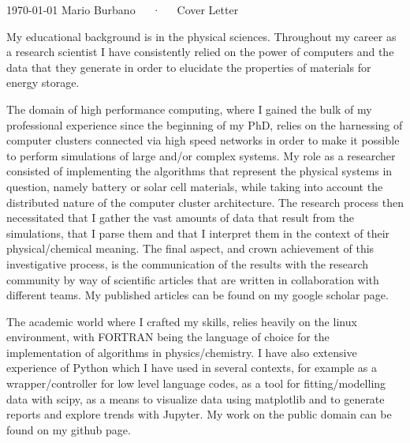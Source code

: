 \documentclass[11pt, a4paper]{awesome-cv}
\begin{document}
\makecvheader[R]

\makecvfooter
  {\today}
  {Mario Burbano~~~·~~~Cover Letter}
  {}

\makelettertitle

\begin{cvletter}


My educational background is in the physical sciences. Throughout my career as a research scientist I have consistently relied on the power of computers and the data that they generate in order to elucidate the properties of materials for energy storage.

The domain of high performance computing, where I gained the bulk of my professional experience since the beginning of my PhD, relies on the harnessing of computer clusters connected via high speed networks in order to make it possible to perform simulations of large and/or complex systems. My role as a researcher consisted of implementing the algorithms that represent the physical systems in question, namely battery or solar cell materials, while taking into account the distributed nature of the computer cluster architecture. The research process then necessitated that I gather the vast amounts of data that result from the simulations, that I parse them and that I interpret them in the context of their physical/chemical meaning. The final aspect, and crown achievement of this investigative process, is the communication of the results with the research community by way of scientific articles that are written in collaboration with different teams. My published articles can be found on my google scholar page.  

The academic world where I crafted my skills, relies heavily on the linux environment, with FORTRAN being the language of choice for the implementation of algorithms in physics/chemistry. I have also extensive experience of Python which I have used in several contexts, for example as a wrapper/controller for low level language codes, as a tool for fitting/modelling data with scipy, as a means to visualize data using matplotlib and to generate reports and explore trends with Jupyter. My work on the public domain can be found on my github page. 


\end{cvletter}
\end{document}
